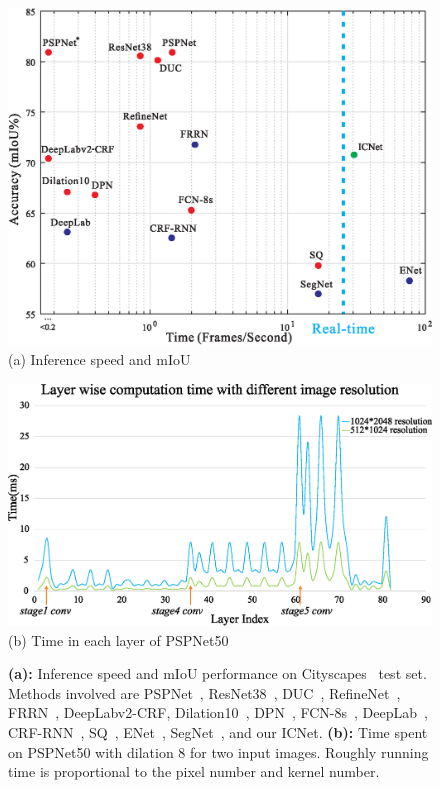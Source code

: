 \documentclass[runningheads]{llncs}
\begin{document}
\begin{figure}[t]
	\begin{minipage}[t]{0.43\linewidth}
		\centering
		\includegraphics[width=0.94\linewidth]{figure/accuracytime.eps}
		{\scriptsize \\(a) Inference speed and mIoU}
	\end{minipage}
	\begin{minipage}[t]{0.55\linewidth}
		\centering
		\includegraphics[width=1.0\linewidth]{figure/timeimageresolution.eps}
		{\scriptsize (b) Time in each layer of PSPNet50}
	\end{minipage}
	\caption{\textbf{(a)\protect\footnotemark:} Inference speed and mIoU performance on Cityscapes~\cite{cordts2016cityscapes}
		test set. Methods involved are PSPNet~\cite{zhao2017pspnet}, ResNet38~\cite{wu2016wider},
		DUC~\cite{wang2017duc}, RefineNet~\cite{lin2017refine}, %
		FRRN~\cite{pohlen2017FRRN}, DeepLabv2-CRF\cite{chen2016deeplab}, Dilation10~\cite{yu2016multi},
		DPN~\cite{liu2015semantic}, FCN-8s~\cite{long2015fully}, DeepLab~\cite{chen2015semantic},
		CRF-RNN~\cite{zheng2015conditional}, SQ~\cite{treml2016speeding},
		ENet~\cite{paszke2016enet}, SegNet~\cite{badrinarayanan2015segnet}, and our ICNet.
		\textbf{(b):} Time spent on PSPNet50 with dilation 8 for two input images. Roughly running time is proportional to the pixel number and kernel number.}
	\label{fig:accuracytime-timeimageresolution}
\end{figure}
\end{document}
